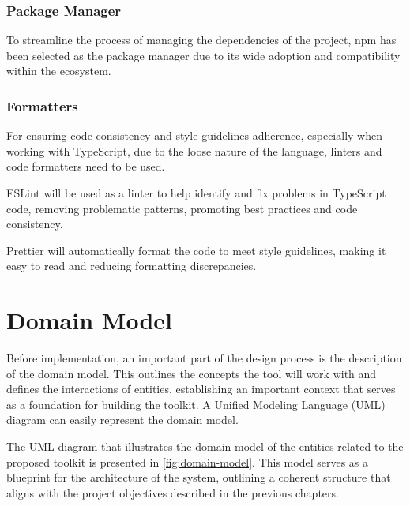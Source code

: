 \subsubsection{Package Manager}

To streamline the process of managing the dependencies of the project, npm has been selected as the package manager due to its wide adoption and compatibility within the ecosystem. \cite{Abramowski2022}

\subsubsection{Formatters}

For ensuring code consistency and style guidelines adherence, especially when working with TypeScript, due to the loose nature of the language, linters and code formatters need to be used.

ESLint will be used as a linter to help identify and fix problems in TypeScript code, removing problematic patterns, promoting best practices and code consistency. \cite{Gupta2021}

Prettier will automatically format the code to meet style guidelines, making it easy to read and reducing formatting discrepancies. \cite{Wojtasinski2023}


\section{Domain Model} \label{section:domain-model}

Before implementation, an important part of the design process is the description of the domain model. This outlines the concepts the tool will work with and defines the interactions of entities, establishing an important context that serves as a foundation for building the toolkit. A Unified Modeling Language (UML) diagram can easily represent the domain model. \cite{Wlaschin2018}

The UML diagram that illustrates the domain model of the entities related to the proposed toolkit is presented in \autoref{fig:domain-model}. This model serves as a blueprint for the architecture of the system, outlining a coherent structure that aligns with the project objectives described in the previous chapters. 


